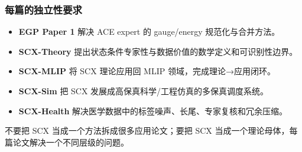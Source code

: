 \documentclass[
  12pt,
]{ctexart}
\providecommand{\tightlist}{%
  \setlength{\itemsep}{0pt}\setlength{\parskip}{0pt}}
\begin{document}
\subsubsection{每篇的独立性要求}\label{ux6bcfux7bc7ux7684ux72ecux7acbux6027ux8981ux6c42}

\begin{itemize}
\tightlist
\item
  \textbf{EGP Paper 1} 解决 ACE expert 的 gauge/energy
  规范化与合并方法。
\item
  \textbf{SCX-Theory}
  提出状态条件专家性与数据价值的数学定义和可识别性边界。
\item
  \textbf{SCX-MLIP} 将 SCX 理论应用回 MLIP 领域，完成理论→应用闭环。
\item
  \textbf{SCX-Sim} 把 SCX 发展成高保真科学/工程仿真的多保真调度系统。
\item
  \textbf{SCX-Health}
  解决医学数据中的标签噪声、长尾、专家复核和冗余压缩。
\end{itemize}

不要把 SCX 当成一个方法拆成很多应用论文；要把 SCX
当成一个理论母体，每篇论文解决一个不同层级的问题。
\end{document}
